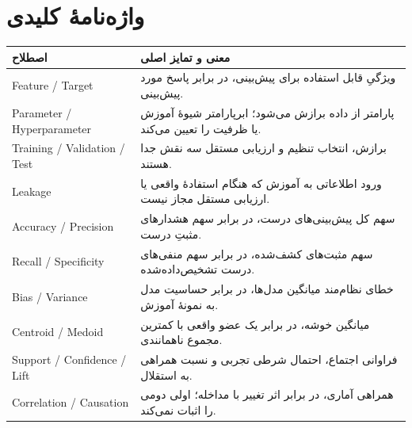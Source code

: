 \section{واژه‌نامهٔ کلیدی}
\begin{longtable}{ll}
\toprule
اصطلاح & معنی و تمایز اصلی\\\midrule\endhead
Feature / Target & ویژگیِ قابل استفاده برای پیش‌بینی، در برابر پاسخ مورد پیش‌بینی.\\
Parameter / Hyperparameter & پارامتر از داده برازش می‌شود؛ ابرپارامتر شیوهٔ آموزش یا ظرفیت را تعیین می‌کند.\\
Training / Validation / Test & برازش، انتخاب تنظیم و ارزیابی مستقل سه نقش جدا هستند.\\
Leakage & ورود اطلاعاتی به آموزش که هنگام استفادهٔ واقعی یا ارزیابی مستقل مجاز نیست.\\
Accuracy / Precision & سهم کل پیش‌بینی‌های درست، در برابر سهم هشدارهای مثبتِ درست.\\
Recall / Specificity & سهم مثبت‌های کشف‌شده، در برابر سهم منفی‌های درست تشخیص‌داده‌شده.\\
Bias / Variance & خطای نظام‌مند میانگین مدل‌ها، در برابر حساسیت مدل به نمونهٔ آموزش.\\
Centroid / Medoid & میانگین خوشه، در برابر یک عضو واقعی با کمترین مجموع ناهمانندی.\\
Support / Confidence / Lift & فراوانی اجتماع، احتمال شرطی تجربی و نسبت همراهی به استقلال.\\
Correlation / Causation & همراهی آماری، در برابر اثر تغییر با مداخله؛ اولی دومی را اثبات نمی‌کند.\\
\bottomrule
\end{longtable}


